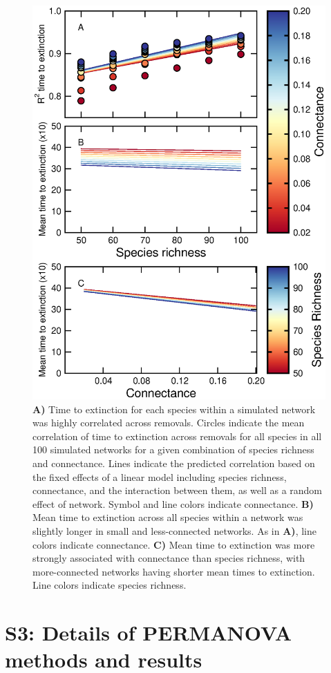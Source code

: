 \documentclass[12pt]{article}
\begin{document}
		\begin{figure}[h!]
			\caption{\textbf{A)} Time to extinction for each species within a simulated network was highly correlated across removals. Circles indicate the mean correlation of time to extinction across removals for all species in all 100 simulated networks for a given combination of species richness and connectance. Lines indicate the predicted correlation based on the fixed effects of a linear model including species richness, connectance, and the interaction between them, as well as a random effect of network. Symbol and line colors indicate connectance. \textbf{B)} Mean time to extinction across all species within a network was slightly longer in small and less-connected networks. As in \textbf{A)}, line colors indicate connectance. \textbf{C)} Mean time to extinction was more strongly associated with connectance than species richness, with more-connected networks having shorter mean times to extinction. Line colors indicate species richness.}
			\label{extorder_corrs}
			\includegraphics[width=.75\textwidth]{figures/extinction_order/extorder_correlations.eps}
			\end{figure}		


\clearpage

\section*{S3: Details of PERMANOVA methods and results}
\end{document}
